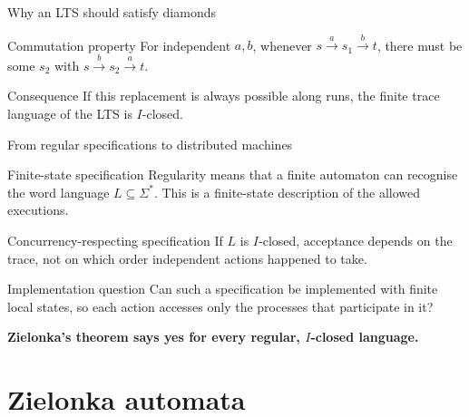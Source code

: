 \documentclass[t,11pt]{beamer}
\begin{document}
\begin{frame}{Why an LTS should satisfy diamonds}
  \begin{block}{Commutation property}
    For independent $a,b$, whenever
    $s\xrightarrow{a}s_1\xrightarrow{b}t$,
    there must be some $s_2$ with
    $s\xrightarrow{b}s_2\xrightarrow{a}t$.
  \end{block}
  \begin{center}
  \end{center}
  \begin{block}{Consequence}
    If this replacement is always possible along runs, the finite trace language of the LTS is $I$-closed.
  \end{block}
\end{frame}

\begin{frame}{From regular specifications to distributed machines}
  \begin{block}{Finite-state specification}
    Regularity means that a finite automaton can recognise the word language $L\subseteq\Sigma^*$. This is a finite-state description of the allowed executions.
  \end{block}
  \begin{block}{Concurrency-respecting specification}
    If $L$ is $I$-closed, acceptance depends on the trace, not on which order independent actions happened to take.
  \end{block}
  \begin{block}{Implementation question}
    Can such a specification be implemented with finite local states, so each action accesses only the processes that participate in it?
  \end{block}
  \centering\textbf{Zielonka's theorem says yes for every regular, $I$-closed language.}
\end{frame}

\section{Zielonka automata}
\end{document}
